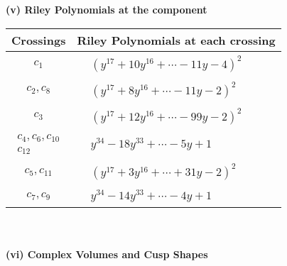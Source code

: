 \documentclass[1p]{elsarticle_modified}
\theoremstyle{definition}
\begin{document}
\newpage\renewcommand{\arraystretch}{1}
\flushleft \textbf{(v) Riley Polynomials at the component}\newline \\
\begin{tabular}{m{50pt}|m{274pt}}
Crossings & \hspace{64pt}Riley Polynomials at each crossing \\
\hline $$\begin{aligned}c_{1}\end{aligned}$$&$\begin{aligned}
&(y^{17}+10 y^{16}+\cdots-11 y-4)^{2}
\end{aligned}$\\
\hline $$\begin{aligned}c_{2},c_{8}\end{aligned}$$&$\begin{aligned}
&(y^{17}+8 y^{16}+\cdots-11 y-2)^{2}
\end{aligned}$\\
\hline $$\begin{aligned}c_{3}\end{aligned}$$&$\begin{aligned}
&(y^{17}+12 y^{16}+\cdots-99 y-2)^{2}
\end{aligned}$\\
\hline $$\begin{aligned}c_{4},c_{6},c_{10}\\c_{12}\end{aligned}$$&$\begin{aligned}
&y^{34}-18 y^{33}+\cdots-5 y+1
\end{aligned}$\\
\hline $$\begin{aligned}c_{5},c_{11}\end{aligned}$$&$\begin{aligned}
&(y^{17}+3 y^{16}+\cdots+31 y-2)^{2}
\end{aligned}$\\
\hline $$\begin{aligned}c_{7},c_{9}\end{aligned}$$&$\begin{aligned}
&y^{34}-14 y^{33}+\cdots-4 y+1
\end{aligned}$\\
\hline
\end{tabular}\\~\\
\newpage\flushleft \textbf{(vi) Complex Volumes and Cusp Shapes}
\end{document}
